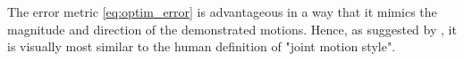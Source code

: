 \documentclass[letterpaper, 10 pt, conference,fleqn]{ieeeconf}
\begin{document}


The error metric \eqref{eq:optim_error} is advantageous in a way that it mimics the magnitude and direction of the demonstrated motions. Hence, as suggested by \cite{gielniak2010stylized}, it is visually most similar to the human definition of "joint motion style".



\end{document}
